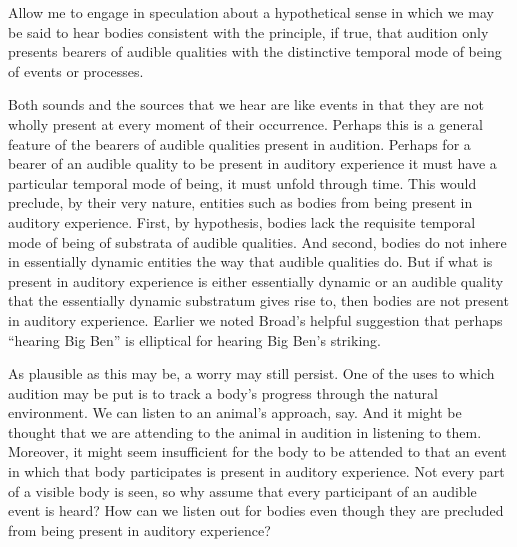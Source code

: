 \documentclass[12pt]{article}
\begin{document}

Allow me to engage in speculation about a hypothetical sense in which we may be said to hear bodies consistent with the principle, if true, that audition only presents bearers of audible qualities with the distinctive temporal mode of being of events or processes.

Both sounds and the sources that we hear are like events in that they are not wholly present at every moment of their occurrence. Perhaps this is a general feature of the bearers of audible qualities present in audition. Perhaps for a bearer of an audible quality to be present in auditory experience it must have a particular temporal mode of being, it must unfold through time. This would preclude, by their very nature, entities such as bodies from being present in auditory experience. First, by hypothesis, bodies lack the requisite temporal mode of being of substrata of audible qualities. And second, bodies do not inhere in essentially dynamic entities the way that audible qualities do. But if what is present in auditory experience is either essentially dynamic or an audible quality that the essentially dynamic substratum gives rise to, then bodies are not present in auditory experience. Earlier we noted Broad’s helpful suggestion that perhaps “hearing Big Ben” is elliptical for hearing Big Ben’s striking.

As plausible as this may be, a worry may still persist. One of the uses to which audition may be put is to track a body’s progress through the natural environment. We can listen to an animal’s approach, say. And it might be thought that we are attending to the animal in audition in listening to them. Moreover, it might seem insufficient for the body to be attended to that an event in which that body participates is present in auditory experience. Not every part of a visible body is seen, so why assume that every participant of an audible event is heard? How can we listen out for bodies even though they are precluded from being present in auditory experience?
\end{document}
